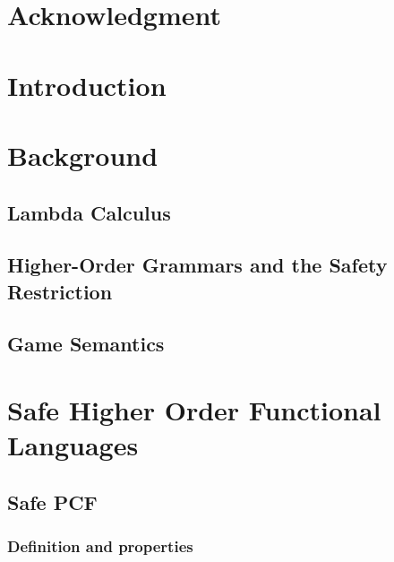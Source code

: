 \begin{romanpages}
\tableofcontents
\listoffigures
\end{romanpages}

\listoftodos
\bigskip

\chapter*{Acknowledgment}
%

\chapter{Introduction}



\chapter{Background}
    \section{Lambda Calculus}
    

    \section{Higher-Order Grammars and the Safety Restriction}
    

    

    \section{Game Semantics}
    

\chapter{Safe Higher Order Functional Languages}
\label{chap:safelambda}
    
    
    


    
    


    \section{Safe PCF}
        \subsection{Definition and properties}
